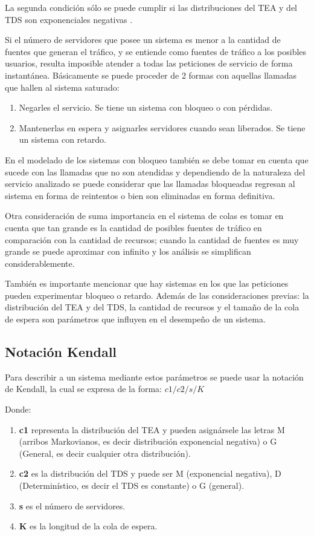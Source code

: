  La segunda condición sólo se puede cumplir si las distribuciones del TEA y del TDS son exponenciales negativas \parencite{Carter1990}.\newline

 Si el número de servidores que posee un sistema es menor a la cantidad de fuentes que generan el tráfico, y se entiende como fuentes de tráfico a los posibles usuarios, resulta imposible atender a todas las peticiones de servicio de forma instantánea. Básicamente se puede proceder de 2 formas con aquellas llamadas que hallen al sistema saturado:
\begin{enumerate}
\item  Negarles el servicio. Se tiene un sistema con bloqueo o con pérdidas.
\item  Mantenerlas en espera y asignarles servidores cuando sean liberados. Se tiene un sistema con retardo.
\end{enumerate}

 En el modelado de los sistemas con bloqueo también se debe tomar en cuenta que sucede con las llamadas que no son atendidas y dependiendo de la naturaleza del servicio analizado se puede considerar que las llamadas bloqueadas regresan al sistema en forma de reintentos o bien son eliminadas en forma definitiva.\newline

 Otra consideración de suma importancia en el sistema de colas es tomar en cuenta que tan grande es la cantidad de posibles fuentes de tráfico en comparación con la cantidad de recursos; cuando la cantidad de fuentes es muy grande se puede aproximar con infinito y los análisis se simplifican considerablemente.\newline

 También es importante mencionar que hay sistemas en los que las peticiones pueden experimentar bloqueo o retardo. Además de las consideraciones previas: la distribución del TEA y del TDS, la cantidad de recursos y el tamaño de la cola de espera son parámetros que influyen en el desempeño de un sistema.

 \subsection{Notación Kendall}

 Para describir a un sistema mediante estos parámetros se puede usar la notación de Kendall, la cual se expresa de la forma:
$c1/ c2/ s/ K$

 Donde:
\begin{enumerate}
    \item  \textbf{c1} representa la distribución del TEA y pueden asignársele las letras M (arribos Markovianos, es decir distribución exponencial negativa) o G (General, es decir cualquier otra distribución).
    \item  \textbf{c2} es la distribución del TDS y puede ser M (exponencial negativa), D (Determinístico, es decir el TDS es constante) o G (general).
    \item  \textbf{s} es el número de servidores.
    \item  \textbf{K} es la longitud de la cola de espera.
\end{enumerate}

